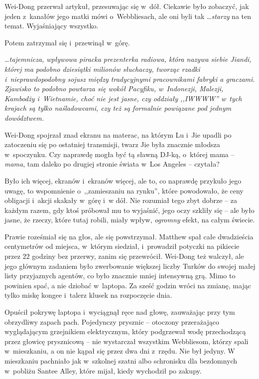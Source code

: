 \documentclass[oneside,polish,11pt,rmheadings]{mwbk}
\begin{document}
Wei-Dong przerwał artykuł, przesuwając się w~dół. Ciekawie było zobaczyć, jak jeden z~kanałów jego matki mówi o~Webbliesach, ale oni byli tak \ldots  \textit{starzy }na ten temat. Wyjaśniający wszystko.

Potem zatrzymał się i~przewinął w~górę.

\textit{ \ldots tajemnicza, wpływowa piracka prezenterka radiowa, która nazywa siebie Jiandi, której ma podobno dziesiątki milionów słuchaczy, tworząc rzadki i~nieprawdopodobny sojusz między tradycyjnymi pracownikami fabryki a graczami. Zjawisko to podobno powtarza się wokół Pacyfiku, w~Indonezji, Malezji, Kambodży i~Wietnamie, choć nie jest jasne, czy oddziały ,,IWWWW'' w~tych krajach są tylko naśladowcami, czy też są formalnie powiązane pod jednym dowództwem.}

Wei-Dong spojrzał znad ekranu na materac, na którym Lu i~Jie upadli po zatoczeniu się po ostatniej transmisji, twarz Jie była znacznie młodsza w~spoczynku. Czy naprawdę mogła być tą sławną DJ-ką, o~której mama -- \textit{mama}, tam daleko po drugiej stronie świata w~Los Angeles -- czytała?

Było ich więcej, ekranów i~ekranów więcej, ale to, co naprawdę przykuło jego uwagę, to wspomnienie o~,,zamieszaniu na rynku'', które powodowało, że ceny obligacji i~akcji skakały w~górę i~w dół. Nie rozumiał tego zbyt dobrze -- za każdym razem, gdy ktoś próbował mu to wyjaśnić, jego oczy szkliły się -- ale było jasne, że rzeczy, które tutaj robili, miały wpływ, \textit{ogromny }efekt, na całym świecie.

Prawie roześmiał się na głos, ale się powstrzymał. Matthew spał całe dwadzieścia centymetrów od miejsca, w~którym siedział, i~prowadził potyczki na pikiecie przez 22 godziny bez przerwy, zanim się przewrócił. Wei-Dong też walczył, ale jego głównym zadaniem było zwerbowanie większej liczby Turków do swojej małej listy przyjaznych agentów, co było znacznie mniej intensywną grą. Mimo to powinien spać, a nie dziobać w~laptopa. Za sześć godzin wróci na zmianę, mając tylko miskę kongee i~talerz klusek na rozpoczęcie dnia.

Opuścił pokrywę laptopa i~wyciągnął ręce nad głowę, zauważając przy tym obrzydliwy zapach pach. Pojedynczy prysznic -- otoczony przerażająco wyglądającym grzejnikiem elektrycznym, który podgrzewał wodę przechodzącą przez głowicę prysznicową -- nie wystarczał wszystkim Webbliesom, którzy spali w~mieszkaniu, a on nie kąpał się przez dwa dni z~rzędu. Nie był jedyny. W mieszkaniu pachniało jak w~szkolnej szatni albo schronisku dla bezdomnych w~pobliżu Santee Alley, które mijał, kiedy wychodził po zakupy.
\end{document}
